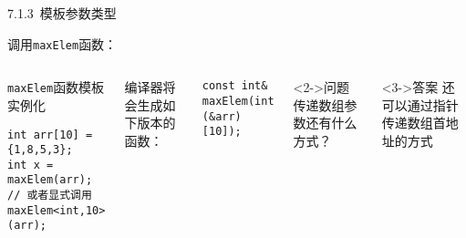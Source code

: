 \begin{frame}[fragile]{7.1.3~模板参数类型}

调用\texttt{maxElem}函数：

\vspace{-4mm}

\begin{columns}[t]

\begin{blueblock}{\texttt{maxElem}函数模板实例化}
\begin{lstlisting}
int arr[10] = {1,8,5,3};
int x = maxElem(arr);
// 或者显式调用 maxElem<int,10>(arr);
\end{lstlisting}
\end{blueblock}
编译器将会生成如下版本的函数：
\begin{blueblock}{}
\begin{lstlisting}
const int& maxElem(int (&arr)[10]);
\end{lstlisting}
\end{blueblock}

\begin{greenblock}<2->{问题}
传递数组参数还有什么方式？
\end{greenblock}
\begin{greenblock}<3->{答案}
还可以通过指针传递数组首地址的方式
\end{greenblock}

\end{columns}

\end{frame}


